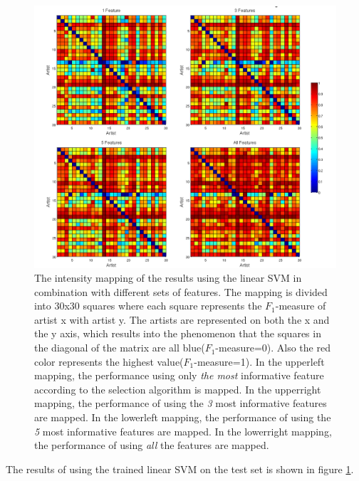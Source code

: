 
\begin{figure}[htb]
  \centering
  \includegraphics[width=0.75\linewidth]{img/experiment2results.png}
  \caption{The intensity mapping of the results using the linear SVM in combination with different sets of features.
  The mapping is divided into 30x30 squares where each square represents the $F_1$-measure of artist x with artist y.
  The artists are represented on both the x and the y axis, which results into the phenomenon that the squares in the diagonal of the matrix are all blue($F_1$-measure=0).
  Also the red color represents the highest value($F_1$-measure=1).
  In the upperleft mapping, the performance using only \textit{the most} informative feature according to the selection algorithm is mapped.
  In the upperright mapping, the performance of using the \textit{3} most informative features are mapped.
  In the lowerleft mapping, the performance of using the \textit{5} most informative features are mapped.
  In the lowerright mapping, the performance of using \textit{all} the features are mapped.
  }
  \label{fig:experiment2results}
\end{figure}

The results of using the trained linear SVM on the test set is shown in figure \ref{fig:experiment2results}. 

